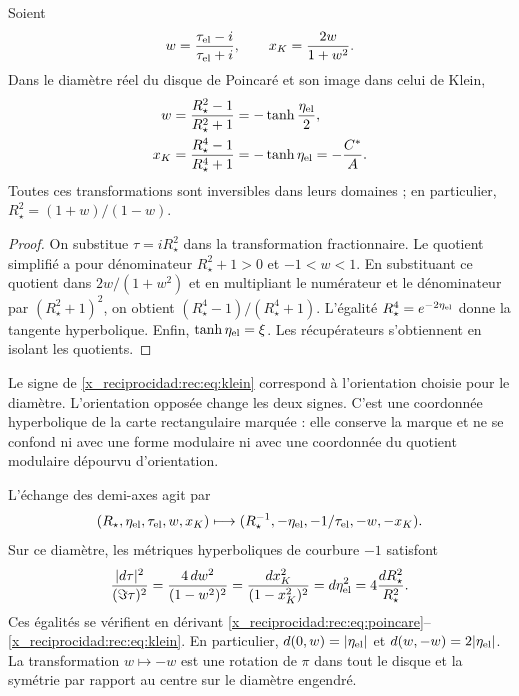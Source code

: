 \begin{theorem}
\label{x_reciprocidad:rec:thm:klein}
Soient
\[
 w=\frac{\tau_{\rm el}-i}{\tau_{\rm el}+i},\qquad
 x_K=\frac{2w}{1+w^2}.
\]
Dans le diamètre réel du disque de Poincaré et son image dans celui de Klein,
\begin{align}
 w&=\frac{R_\star^2-1}{R_\star^2+1}
      =-\tanh\frac{\eta_{\rm el}}2,\label{x_reciprocidad:rec:eq:poincare}\\
 x_K&=\frac{R_\star^4-1}{R_\star^4+1}
      =-\tanh\eta_{\rm el}=-\frac{C^*}{A}.\label{x_reciprocidad:rec:eq:klein}
\end{align}
Toutes ces transformations sont inversibles dans leurs domaines ; en particulier,
\(R_\star^2=(1+w)/(1-w)\).
\end{theorem}
\begin{proof}
On substitue \(\tau=iR_\star^2\) dans la transformation fractionnaire. Le quotient simplifié a pour dénominateur \(R_\star^2+1>0\) et \(-1<w<1\). En substituant ce quotient dans \(2w/(1+w^2)\) et en multipliant le numérateur et le dénominateur par \((R_\star^2+1)^2\), on obtient \((R_\star^4-1)/(R_\star^4+1)\). L’égalité \(R_\star^4=e^{-2\eta_{\rm el}}\) donne la tangente hyperbolique. Enfin, \(\tanh\eta_{\rm el}=\xi\). Les récupérateurs s’obtiennent en isolant les quotients.
\end{proof}

Le signe de \eqref{x_reciprocidad:rec:eq:klein} correspond à l'orientation choisie pour le diamètre. L'orientation opposée change les deux signes. C'est une coordonnée hyperbolique de la carte rectangulaire marquée : elle conserve la marque et ne se confond ni avec une forme modulaire ni avec une coordonnée du quotient modulaire dépourvu d'orientation.

L’échange des demi-axes agit par
\begin{equation}
 (R_\star,\eta_{\rm el},\tau_{\rm el},w,x_K)
 \longmapsto(R_\star^{-1},-\eta_{\rm el},-1/\tau_{\rm el},-w,-x_K).
 \label{x_reciprocidad:rec:eq:reciproco-radial}
\end{equation}
Sur ce diamètre, les métriques hyperboliques de courbure \(-1\) satisfont
\begin{equation}
 \frac{|d\tau|^2}{(\Im\tau)^2}
 =\frac{4\,dw^2}{(1-w^2)^2}
 =\frac{dx_K^2}{(1-x_K^2)^2}
 =d\eta_{\rm el}^2=4\frac{dR_\star^2}{R_\star^2}.
 \label{x_reciprocidad:rec:eq:metricas}
\end{equation}
Ces égalités se vérifient en dérivant \eqref{x_reciprocidad:rec:eq:poincare}--\eqref{x_reciprocidad:rec:eq:klein}. En particulier, \(d(0,w)=|\eta_{\rm el}|\) et \(d(w,-w)=2|\eta_{\rm el}|\). La transformation \(w\mapsto-w\) est une rotation de \(\pi\) dans tout le disque et la symétrie par rapport au centre sur le diamètre engendré.

